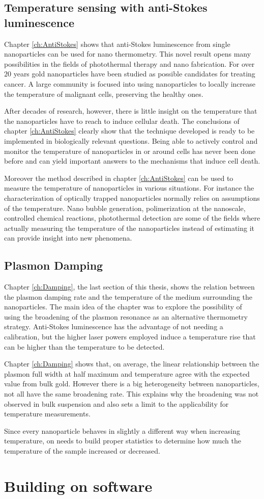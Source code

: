 \subsection{Temperature sensing with anti-Stokes luminescence}
Chapter \ref{ch:AntiStokes} shows that anti-Stokes luminescence from single
nanoparticles can be used for nano thermometry. This novel result opens many
possibilities in the fields of photothermal therapy and nano fabrication. For
over $20$ years gold nanoparticles have been studied as possible candidates for
treating cancer. A large community is focused into using nanoparticles to
locally increase the temperature of malignant cells, preserving the healthy
ones.

After decades of research, however, there is little insight on the temperature
that the nanoparticles have to reach to induce cellular death. The conclusions
of chapter \ref{ch:AntiStokes} clearly show that the technique developed is
ready to be implemented in biologically relevant questions. Being able to
actively control and monitor the temperature of nanoparticles in or around cells
has never been done before and can yield important answers to the mechanisms
that induce cell death. 

Moreover the method described in chapter \ref{ch:AntiStokes} can be used to
measure the temperature of nanoparticles in various situations. For instance
the characterization of optically trapped nanoparticles normally relies on
assumptions of the temperature. Nano bubble generation, polimerization at the
nanoscale, controlled chemical reactions, photothermal detection are some of the
fields where actually measuring the temperature of the nanoparticles instead
of estimating it can provide insight into new phenomena. 

\subsection{Plasmon Damping}
Chapter \ref{ch:Damping}, the last section of this thesis, shows the relation
between the plasmon damping rate and the temperature of the medium surrounding
the nanoparticles. The main idea of the chapter was to explore the possibility
of using the broadening of the plasmon resonance as an alternative thermometry
strategy. Anti-Stokes luminescence has the advantage of not needing a
calibration, but the higher laser powers employed induce a temperature rise that
can be higher than the temperature to be detected.

Chapter \ref{ch:Damping} shows that, on average, the linear relationship between
the plasmon full width at half maximum and temperature agree with the expected
value from bulk gold. However there is a big heterogeneity between 
nanoparticles, not all have the same broadening rate. This explains why the
broadening was not observed in bulk suspension and also sets a limit to the
applicability for temperature measurements. 

Since every nanoparticle behaves in slightly a different way when increasing
temperature, on needs to build proper statistics to determine how much the
temperature of the sample increased or decreased. 


\section{Building on software}

